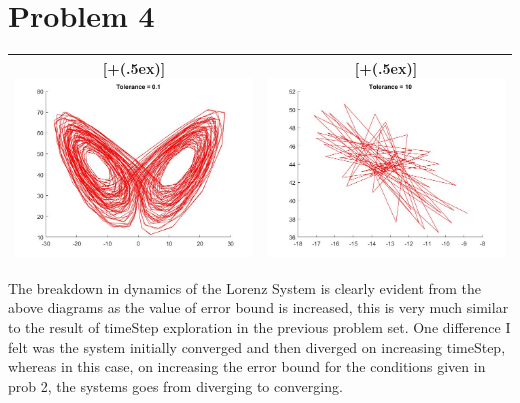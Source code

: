 \documentclass{article}
\newcommand*{\addheight}[2][.5ex]{%
  \raisebox{0pt}[\dimexpr\height+(#1)\relax]{#2}%
}
\begin{document}
\section*{Problem 4}
\begin{table}[H]
\centering
\begin{tabular}{|c|c|}
	\hline
	\addheight{\includegraphics[width=80mm]{images/prob4a.jpg}} &
    \addheight{\includegraphics[width=80mm]{images/prob4b.jpg}} \\
    \hline
\end{tabular}
\end{table}

The breakdown in dynamics of the Lorenz System is clearly evident from the above diagrams as the value of error bound is increased, this is very much similar to the result of timeStep exploration in the previous problem set. One difference I felt was the system initially converged and then diverged on increasing timeStep, whereas in this case, on increasing the error bound for the conditions given in prob 2, the systems goes from diverging to converging.
\end{document}
